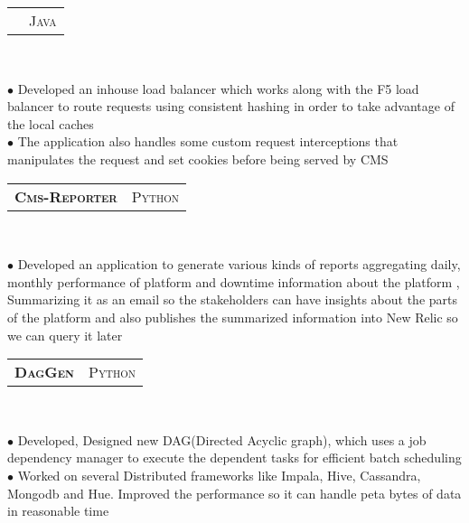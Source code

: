 \documentclass[10pt,a4paper,oneside]{article}
\begin{document}
\begin{minipage}[t]{0.63\textwidth}
\begin{tabular}{c|c}
            &\textmd{\normalsize J\textsc{ava}}
        \end{tabular}\\
         \vspace{-4mm}
        \begin{adjustwidth}{7pt}{0pt}
            {\footnotesize $\bullet$  Developed an inhouse load balancer which works along with the F5 load balancer to route requests using consistent hashing in order to take advantage of the local caches\\ 
            $\bullet$ The application also handles some custom request interceptions that manipulates the request and set cookies before being served by CMS}\\ 
        \end{adjustwidth}
        \begin{tabular}{c|c}
            \textbf{\normalsize C\textsc{ms}-R\textsc{eporter}}
            &\textmd{\normalsize P\textsc{ython}}
        \end{tabular}\\
         \vspace{-4mm}
        \begin{adjustwidth}{7pt}{0pt}
            {\footnotesize $\bullet$ Developed an application to generate various kinds of reports aggregating daily, monthly performance of platform and downtime information about the platform , Summarizing it as an email so the stakeholders can have insights about the parts of the platform and also publishes the summarized information into New Relic so we can query it later}\\
        \end{adjustwidth}
        \begin{tabular}{c|c}
            \textbf{\normalsize D\textsc{ag}G\textsc{en}}
            &\textmd{\normalsize P\textsc{ython}}
        \end{tabular}\\
         \vspace{-4mm}
        \begin{adjustwidth}{7pt}{0pt}
            {\footnotesize $\bullet$  Developed, Designed new DAG(Directed Acyclic graph), which uses a job dependency manager to execute the dependent tasks for efficient batch scheduling\\ 
            $\bullet$ Worked on several Distributed frameworks like Impala, Hive, Cassandra, Mongodb and
Hue. Improved the performance so it can handle peta bytes of data in reasonable time}\\ 

\end{adjustwidth}
\end{minipage}
\end{document}
